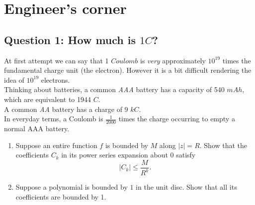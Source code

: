 \documentclass[12pt]{article}
\newcommand{\I}{\textit}
\newenvironment{problem}[2][Problem]{\begin{trivlist}
\item[\hskip \labelsep {\bfseries #1}\hskip \labelsep {\bfseries #2.}]}{\end{trivlist}}
\begin{document}


\newpage
\section{Engineer's corner}
\subsection*{Question 1: How much is $1 C$?} 
At first attempt we can say that 1 $Coulomb$ is \I{very} approximately $10^{19}$ times the fundamental charge unit (the electron). However it is a bit difficult rendering the idea of $10^{19}$ electrons. \\
Thinking about batteries, a common \I{AAA} battery has a capacity of 540 $mAh$, which are equivalent to 1944 $C$. \\
A common \I{AA} battery has a charge of 9 $kC$. \\
In everyday terms, a Coulomb is $\frac{1}{2000}$ times the charge occurring to empty a normal AAA battery.








\newpage
\begin{problem}{6}
\begin{enumerate}[label=\alph*)]
    \item Suppose an entire function $f$ is bounded by $M$ along $|z|=R$. Show that the coefficients $C_k$ in its power series expansion about $0$ satisfy
    \[
    |C_k|\leq\frac{M}{R^k}.
    \]
    \item Suppose a polynomial is bounded by $1$ in the unit disc. Show that all its coefficients are bounded by 1.
\end{enumerate}
\end{problem}
\end{document}
